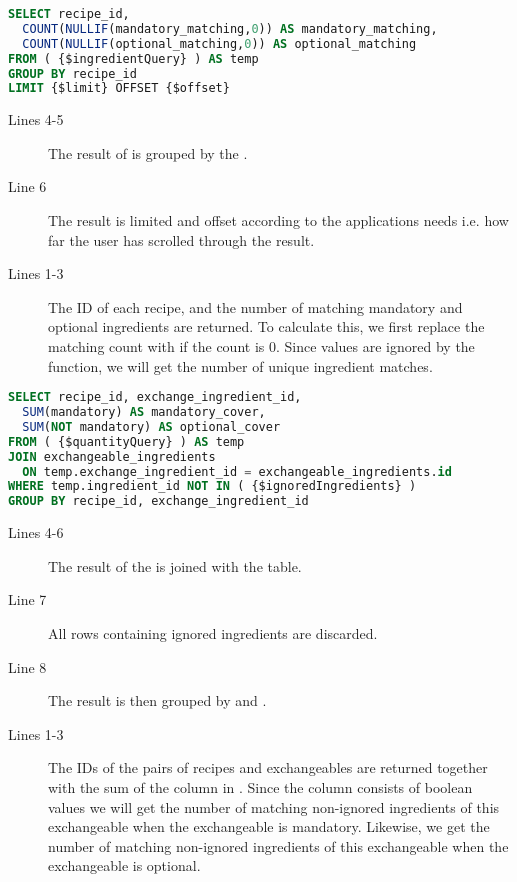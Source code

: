 \begin{lstlisting}[language=SQL, morekeywords={OFFSET}, float=h, label={}, caption={\$matchingQuery, get the matching ingredients count.}]
SELECT recipe_id,
  COUNT(NULLIF(mandatory_matching,0)) AS mandatory_matching,
  COUNT(NULLIF(optional_matching,0)) AS optional_matching
FROM ( {$ingredientQuery} ) AS temp
GROUP BY recipe_id
LIMIT {$limit} OFFSET {$offset}
\end{lstlisting}

\begin{description}
\item[Lines 4-5] The result of  is grouped by the .
\item[Line 6] The result is limited and offset according to the applications needs i.e. how far the user has scrolled through the result.
\item[Lines 1-3] The ID of each recipe, and the number of matching mandatory and optional ingredients are returned. To calculate this, we first replace the matching count with  if the count is 0. Since  values are ignored by the  function, we will get the number of unique ingredient matches.
\end{description}



\begin{lstlisting}[language=SQL, float=h, label={}, caption={\$exchangeQuery, get the number of times the individual exchangeable appear in each recipe.}]
SELECT recipe_id, exchange_ingredient_id,
  SUM(mandatory) AS mandatory_cover,
  SUM(NOT mandatory) AS optional_cover
FROM ( {$quantityQuery} ) AS temp
JOIN exchangeable_ingredients
  ON temp.exchange_ingredient_id = exchangeable_ingredients.id
WHERE temp.ingredient_id NOT IN ( {$ignoredIngredients} )
GROUP BY recipe_id, exchange_ingredient_id
\end{lstlisting}

\begin{description}
\item[Lines 4-6] The result of the  is joined with the  table.
\item[Line 7] All rows containing ignored ingredients are discarded.
\item[Line 8] The result is then grouped by  and .
\item[Lines 1-3] The IDs of the pairs of recipes and exchangeables are returned together with the sum of the  column in . Since the  column consists of boolean values we will get the number of matching non-ignored ingredients of this exchangeable when the exchangeable is mandatory. Likewise, we get the number of matching non-ignored ingredients of this exchangeable when the exchangeable is optional.
\end{description}



